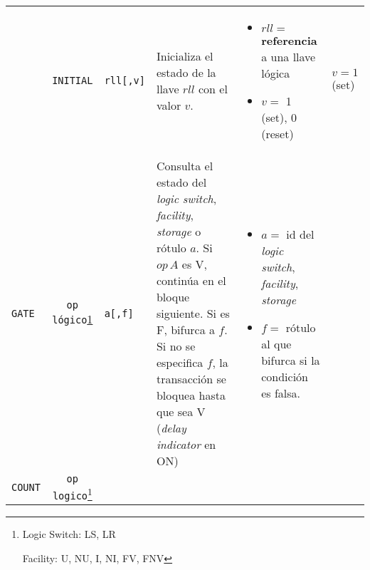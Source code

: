\documentclass{article}
\providecommand{\tabularnewline}{\\}
\begin{document}
\begin{longtable}{|lc>{\raggedright}p{}|>{\raggedright}p{}|>{\raggedright}p{}|>{\raggedright}p{}|}
 & \tabularnewline
\hline 
 & \texttt{INITIAL} & \texttt{rll{[},v{]}} & Inicializa el estado de la llave $rll$ con el valor $v$. & \begin{itemize}
\item $rll=$\textbf{ referencia} a una llave lógica
\item $v=$ 1 (set), 0 (reset)\end{itemize}
 & $v=1$(set)\tabularnewline
\hline 
\texttt{GATE} & \texttt{op lógico\ref{op_logicos}} & \texttt{a{[},f{]}} & Consulta el estado del \emph{logic switch}, \emph{facility}, \emph{storage}
o rótulo $a$. Si $op\,A$ es V, continúa en el bloque siguiente.
Si es F, bifurca a $f$. Si no se especifica $f$, la transacción
se bloquea hasta que sea V (\emph{delay indicator }en ON) & \begin{itemize}
\item $a=$ id del \emph{logic switch}, \emph{facility}, \emph{storage}
\item $f=$ rótulo al que bifurca si la condición es falsa.\end{itemize}
 & \tabularnewline
\hline 
\texttt{COUNT} & \texttt{op logico}\footnote{\label{op_logicos}Logic Switch: LS, LR

Facility: U, NU, I, NI, FV, FNV

}
\end{longtable}
\end{document}
